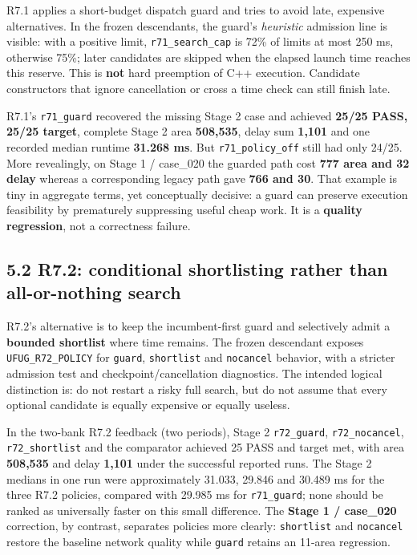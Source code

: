 \documentclass[a4paper,10pt]{article}
\theoremstyle{definition}
\theoremstyle{remark}
\begin{document}
R7.1 applies a short-budget dispatch guard and tries to avoid late, expensive alternatives. In the frozen descendants, the guard's \emph{heuristic} admission line is visible: with a positive limit, \texttt{r71\_search\_cap} is 72\% of limits at most 250 ms, otherwise 75\%; later candidates are skipped when the elapsed launch time reaches this reserve. This is \textbf{not} hard preemption of C++ execution. Candidate constructors that ignore cancellation or cross a time check can still finish late.

R7.1's \texttt{r71\_guard} recovered the missing Stage 2 case and achieved \textbf{25/25 PASS, 25/25 target}, complete Stage 2 area \textbf{508,535}, delay sum \textbf{1,101} and one recorded median runtime \textbf{31.268 ms}. But \texttt{r71\_policy\_off} still had only 24/25. More revealingly, on Stage 1 / case\_020 the guarded path cost \textbf{777 area and 32 delay} whereas a corresponding legacy path gave \textbf{766 and 30}. That example is tiny in aggregate terms, yet conceptually decisive: a guard can preserve execution feasibility by prematurely suppressing useful cheap work. It is a \textbf{quality regression}, not a correctness failure.

\subsection{5.2 R7.2: conditional shortlisting rather than all-or-nothing search}\label{r7.2-conditional-shortlisting-rather-than-all-or-nothing-search}

R7.2's alternative is to keep the incumbent-first guard and selectively admit a \textbf{bounded shortlist} where time remains. The frozen descendant exposes \texttt{UFUG\_R72\_POLICY} for \texttt{guard}, \texttt{shortlist} and \texttt{nocancel} behavior, with a stricter admission test and checkpoint/cancellation diagnostics. The intended logical distinction is: do not restart a risky full search, but do not assume that every optional candidate is equally expensive or equally useless.

In the two-bank R7.2 feedback (two periods), Stage 2 \texttt{r72\_guard}, \texttt{r72\_nocancel}, \texttt{r72\_shortlist} and the comparator achieved 25 PASS and target met, with area \textbf{508,535} and delay \textbf{1,101} under the successful reported runs. The Stage 2 medians in one run were approximately 31.033, 29.846 and 30.489 ms for the three R7.2 policies, compared with 29.985 ms for \texttt{r71\_guard}; none should be ranked as universally faster on this small difference. The \textbf{Stage 1 / case\_020} correction, by contrast, separates policies more clearly: \texttt{shortlist} and \texttt{nocancel} restore the baseline network quality while \texttt{guard} retains an 11-area regression.
\end{document}
